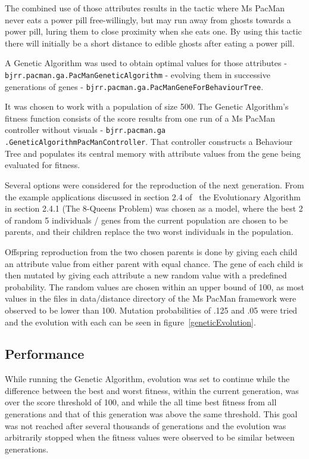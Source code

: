 \documentclass[conference]{IEEEtran}
\begin{document}
The combined use of those attributes results in the tactic where Ms PacMan never eats a power pill free-willingly, but may run away from ghosts towards a power pill, luring them to close proximity when she eats one.  By using this tactic there will initially be a short distance to edible ghosts after eating a power pill.

A Genetic Algorithm was used to obtain optimal values for those attributes - \texttt{bjrr.pacman.ga.PacManGeneticAlgorithm} - evolving them in successive generations of genes - \texttt{bjrr.pacman.ga.PacManGeneForBehaviourTree}.

It was chosen to work with a population of size 500.  The Genetic Algorithm's fitness function consists of the score results from one run of a Ms PacMan controller without visuals - \texttt{bjrr.pacman.ga\\.GeneticAlgorithmPacManController}.  That controller constructs a Behaviour Tree and populates its central memory with attribute values from the gene being evaluated for fitness.

Several options were considered for the reproduction of the next generation.  From the example applications discussed in section 2.4 of~\cite{eiben2003introduction} the Evolutionary Algorithm in section 2.4.1 (The 8-Queens Problem) was chosen as a model, where the best 2 of random 5 individuals / genes from the current population are chosen to be parents, and their children replace the two worst individuals in the population.

Offspring reproduction from the two chosen parents is done by giving each child an attribute value from either parent with equal chance.  The gene of each child is then mutated by giving each attribute a new random value with a predefined probability.  The random values are chosen within an upper bound of 100, as most values in the files in data/distance directory of the Ms PacMan framework were observed to be lower than 100.  Mutation probabilities of .125 and .05 were tried and the evolution with each can be seen in figure~\ref{geneticEvolution}.

\subsection{Performance}

While running the Genetic Algorithm, evolution was set to continue while the difference between the best and worst fitness, within the current generation, was over the score threshold of 100, and while the all time best fitness from all generations and that of this generation was above the same threshold.  This goal was not reached after several thousands of generations and the evolution was arbitrarily stopped when the fitness values were observed to be similar between generations.
\end{document}
